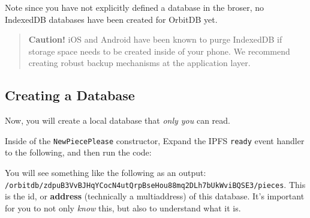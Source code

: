 Note since you have not explicitly defined a database in the broser, no
IndexedDB databases have been created for OrbitDB yet.

\begin{quote}
\textbf{Caution!} iOS and Android have been known to purge IndexedDB if
storage space needs to be created inside of your phone. We recommend
creating robust backup mechanisms at the application layer.
\end{quote}

\subsection{Creating a Database}\label{creating-a-database-1}

Now, you will create a local database that \emph{only you} can read.

Inside of the \texttt{NewPiecePlease} constructor, Expand the IPFS
\texttt{ready} event handler to the following, and then run the code:

\begin{Shaded}
\begin{Highlighting}[]
\NormalTok{(}\OperatorTok{,} \NormalTok{ () }\OperatorTok{=>} \OperatorTok{\{}
\OperatorTok{=}

  \OperatorTok{=} \OperatorTok{\{}
    \OperatorTok{:} \OperatorTok{\{} \OperatorTok{:}\NormalTok{ [}\NormalTok{] }\OperatorTok{\},}
    \OperatorTok{:} 
  \OperatorTok{\}}
  
\OperatorTok{=}\NormalTok{(}\OperatorTok{,}
  \NormalTok{(}\NormalTok{)}
\OperatorTok{\}}\NormalTok{)}
\end{Highlighting}
\end{Shaded}

You will see something like the following as an output:
\texttt{/orbitdb/zdpuB3VvBJHqYCocN4utQrpBseHou88mq2DLh7bUkWviBQSE3/pieces}.
This is the id, or \textbf{address} (technically a multiaddress) of this
database. It's important for you to not only \emph{know} this, but also
to understand what it is.

